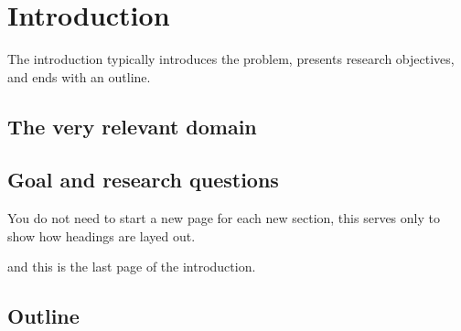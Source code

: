 
\chapter{Introduction}
The introduction typically introduces the problem, presents research objectives, and ends with an outline.

\section{The very relevant domain}

\newpage
\section{Goal and research questions}
You do not need to start a new page for each new section, this serves only to show how headings are layed out.

\newpage

and this is the last page of the introduction.
\section{Outline}
